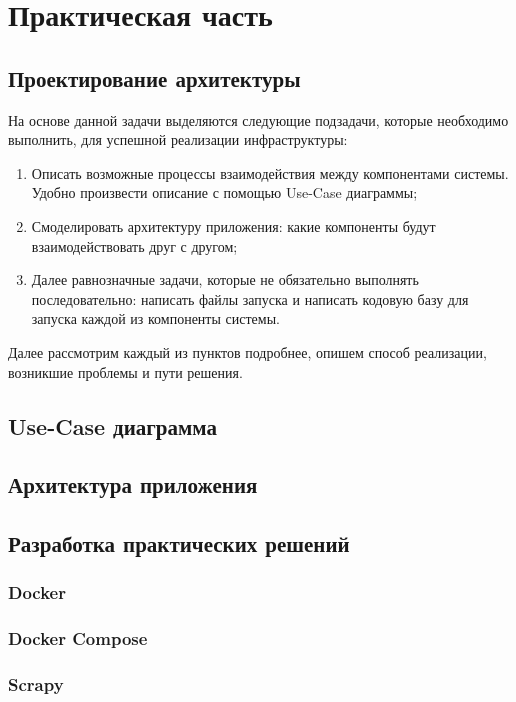 \chapter{Практическая часть}
\label{cha:ch_2}

\section{Проектирование архитектуры}
На основе данной задачи выделяются следующие подзадачи, которые необходимо
выполнить, для успешной реализации инфраструктуры:
\begin{enumerate}[label=\arabic*.]
    \item Описать возможные процессы взаимодействия между компонентами системы.
        Удобно произвести описание с помощью Use-Case диаграммы;
    \item Смоделировать архитектуру приложения: какие компоненты будут
        взаимодействовать друг с другом;
    \item Далее равнозначные задачи, которые не обязательно выполнять
        последовательно: написать файлы запуска и написать кодовую базу для
        запуска каждой из компоненты системы.
\end{enumerate}

Далее рассмотрим каждый из пунктов подробнее, опишем способ реализации,
возникшие проблемы и пути решения.

\section{Use-Case диаграмма}
\section{Архитектура приложения}
\section{Разработка практических решений}
\subsection{Docker}
\subsection{Docker Compose}
\subsection{Scrapy}
